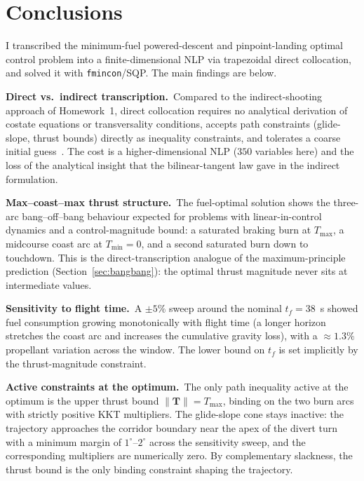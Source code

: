 \documentclass[../main.tex]{subfiles}
\begin{document}
\section{Conclusions}\label{sec:conclusions}

I transcribed the minimum-fuel powered-descent and pinpoint-landing optimal control problem into a finite-dimensional NLP via trapezoidal direct collocation, and solved it with \texttt{fmincon}/SQP. The main findings are below.

\textbf{Direct vs.\ indirect transcription.}\ Compared to the indirect-shooting approach of Homework~1, direct collocation requires no analytical derivation of costate equations or transversality conditions, accepts path constraints (glide-slope, thrust bounds) directly as inequality constraints, and tolerates a coarse initial guess~\cite[Sec.~4.12.7]{betts2010}. The cost is a higher-dimensional NLP ($350$ variables here) and the loss of the analytical insight that the bilinear-tangent law gave in the indirect formulation.

\textbf{Max--coast--max thrust structure.}\ The fuel-optimal solution shows the three-arc bang--off--bang behaviour expected for problems with linear-in-control dynamics and a control-magnitude bound: a saturated braking burn at $T_{\max}$, a midcourse coast arc at $T_{\min} = 0$, and a second saturated burn down to touchdown. This is the direct-transcription analogue of the maximum-principle prediction (Section~\ref{sec:bangbang}): the optimal thrust magnitude never sits at intermediate values.

\textbf{Sensitivity to flight time.}\ A $\pm 5\%$ sweep around the nominal $t_f = 38$~s showed fuel consumption growing monotonically with flight time (a longer horizon stretches the coast arc and increases the cumulative gravity loss), with a $\approx 1.3\%$ propellant variation across the window. The lower bound on $t_f$ is set implicitly by the thrust-magnitude constraint.

\textbf{Active constraints at the optimum.}\ The only path inequality active at the optimum is the upper thrust bound $\|\mathbf{T}\| = T_{\max}$, binding on the two burn arcs with strictly positive KKT multipliers. The glide-slope cone stays inactive: the trajectory approaches the corridor boundary near the apex of the divert turn with a minimum margin of $1^\circ$--$2^\circ$ across the sensitivity sweep, and the corresponding multipliers are numerically zero. By complementary slackness, the thrust bound is the only binding constraint shaping the trajectory.
\end{document}
